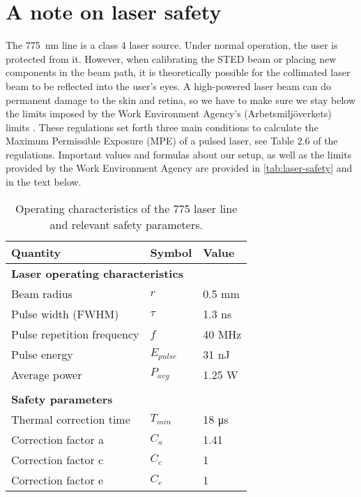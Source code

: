 
\chapter{A note on laser safety}

The \SI{775}{nm} line is a class 4 laser source. Under normal operation, the user is protected from it. However, when calibrating the STED beam or placing new components in the beam path, it is theoretically possible for the collimated laser beam to be reflected into the user's eyes. A high-powered laser beam can do permanent damage to the skin and retina, so we have to make sure we stay below the limits imposed by the Work Environment Agency's (Arbetsmiljöverkets) limits \cite{AFS2009:7}. These regulations set forth three main conditions to calculate the Maximum Permissible Exposure (MPE) of a pulsed laser, see Table 2.6 of the regulations. Important values and formulas about our setup, as well as the limits provided by the Work Environment Agency are provided in \autoref{tab:laser-safety} and in the text below.

\begin{table}[h]
	\centering

	\begin{tabular}{lll}
		\toprule
		Quantity                   & Symbol               & Value                 \\ \midrule
		\multicolumn{3}{l}{\textbf{Laser operating characteristics}}              \\
		Beam radius                & $ r $                & 0.5 mm                \\
		Pulse width (FWHM)         & $ \tau $             & 1.3 ns                \\
		Pulse repetition frequency & $ f $                & 40 MHz                \\
		Pulse energy               & $ E_\mathit{pulse} $ & 31 nJ                 \\
		Average power              & $P_\mathit{avg} $    & 1.25 W                \\
		                           &                      &  \\
		\multicolumn{3}{l}{\textbf{Safety parameters}}                            \\
		Thermal correction time    & $ T_\mathit{min} $   & 18 \si{\micro\second} \\
		Correction factor a        & $ C_a $              & 1.41                  \\
		Correction factor c        & $ C_c $              & 1                     \\
		Correction factor e        & $ C_e $              & 1                     \\ \bottomrule
	\end{tabular}	
	\caption{Operating characteristics of the 775 laser line and relevant safety parameters. }
	\label{tab:laser-safety}
\end{table}

